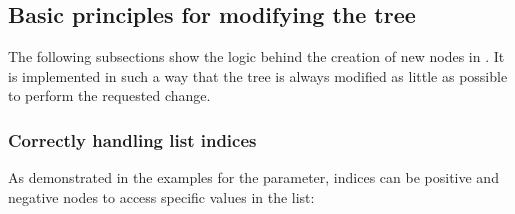 \documentclass[a4paper,10pt,english]{sphinxmanual}
\begin{document}
\subsection{Basic principles for modifying the tree}
\label{\detokenize{README:basic-principles-for-modifying-the-tree}}
\sphinxAtStartPar
The following subsections show the logic behind the creation of new nodes in . It is implemented in such a way that the tree is always modified as little as possible to perform the requested change.


\subsubsection{Correctly handling list indices}
\label{\detokenize{README:correctly-handling-list-indices}}
\sphinxAtStartPar
As demonstrated in the examples for the {\hyperref[\detokenize{README:the-path-parameter}]{\emph{}}}\sphinxhyphen{}parameter,  indices can be positive and negative \sphinxhyphen{}nodes to access specific values in the list:

\begin{sphinxVerbatim}[commandchars=\\\{\},numbers=left,firstnumber=1,stepnumber=1]
  \PYG{p}{[}\PYG{p}{[}\PYG{p}{[} \PYG{p}{]} \PYG{p}{]} \PYG{p}{[}  \PYG{p}{[} \PYG{p}{[} \PYG{p}{]}\PYG{p}{]} \PYG{p}{]}\PYG{p}{]}  
\PYG{p}{[}\PYG{p}{]}  
\PYG{p}{[}\PYG{p}{]}    
\end{sphinxVerbatim}
\end{document}

